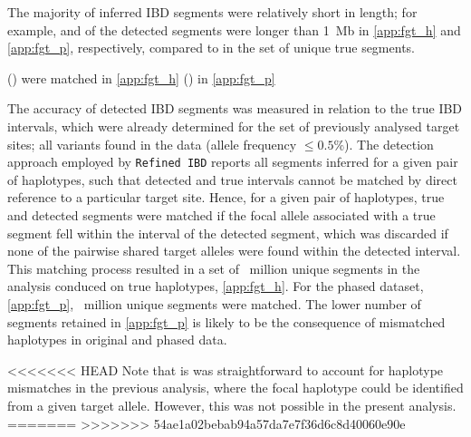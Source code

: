 The majority of inferred IBD segments were relatively short in length;
for example,  and  of the detected segments were longer than 1~\gls{Mb} in \ref{app:fgt_h} and \ref{app:fgt_p}, respectively,
compared to  in the set of unique true segments.

 () were matched in \ref{app:fgt_h}
 () in \ref{app:fgt_p}

The accuracy of detected IBD segments was measured in relation to the true IBD intervals, which were already determined for the set of previously analysed target sites; \ie all \fk{[2,25]} variants found in the data (allele frequency $\leq 0.5\%$).
The detection approach employed by \texttt{Refined\,IBD} reports all segments inferred for a given pair of haplotypes, such that detected and true intervals cannot be matched by direct reference to a particular target site.
Hence, for a given pair of haplotypes, true and detected segments were matched if the focal allele associated with a true segment fell within the interval of the detected segment, which was discarded if none of the pairwise shared target alleles were found within the detected interval.
This matching process resulted in a set of ~million unique segments in the analysis conduced on true haplotypes, \cref{app:fgt_h}.
For the phased dataset, \cref{app:fgt_p}, ~million unique segments were matched.
The lower number of segments retained in \cref{app:fgt_p} is likely to be the consequence of mismatched haplotypes in original and phased data.

<<<<<<< HEAD
\Correct{}
Note that is was straightforward to account for haplotype mismatches in the previous analysis, where the focal haplotype could be identified from a given target allele.
However, this was not possible in the present analysis.
=======
>>>>>>> 54ae1a02bebab94a57da7e7f36d6c8d40060e90e

